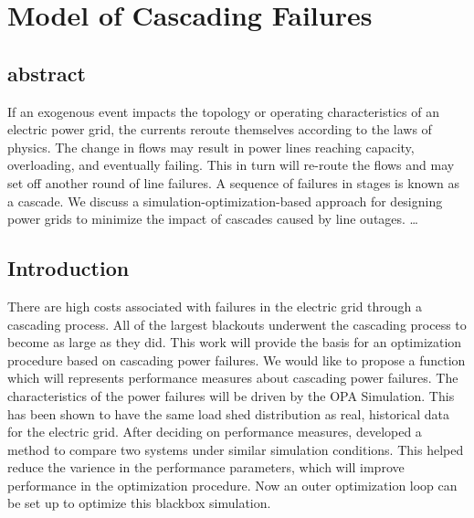 
\chapter{Model of Cascading Failures}

\section{abstract}
If an exogenous event impacts the topology or operating characteristics of an electric power grid, the currents reroute themselves according to the laws of physics.  The change in flows may result in power lines reaching capacity, overloading, and eventually failing.  This in turn will re-route the flows and may set off another round of line failures.  A sequence of failures in stages is known as a cascade.  We discuss a simulation-optimization-based approach for designing power grids to minimize the impact of cascades caused by line outages.
 \ldots


\section{Introduction}
There are high costs associated with failures in the electric grid through a cascading process.  All of the largest blackouts underwent the cascading process to become as large as they did.  This work will provide the basis for an optimization procedure based on cascading power failures. We would like to propose a function which will represents performance measures about cascading power failures.  The characteristics of the power failures will be driven by the OPA Simulation.  This has been shown to have the same load shed distribution as real, historical data for the electric grid.  After deciding on performance measures, developed a method to compare two systems under similar simulation conditions.  This helped reduce the varience in the performance parameters, which will improve performance in the optimization procedure. Now an outer optimization loop can be set up to optimize this blackbox simulation.
